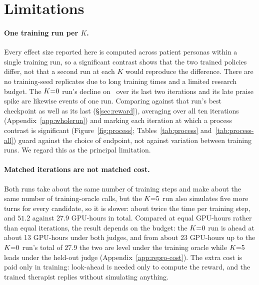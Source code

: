 \section*{Limitations}
\label{sec:limitations}

\paragraph{\boldmath One training run per $K$.}
Every effect size reported here is computed across patient personas within a single training run,
so a significant contrast shows that the two trained policies differ, not that a second run at each
$K$ would reproduce the difference. There are no training-seed replicates due to long training times and a limited research budget. The $K{=}0$
run's decline on \QQ\ over its last two iterations and its late praise spike are likewise events of
one run. Comparing against that run's best checkpoint as well as its last (\S\ref{sec:reward}),
averaging over all ten iterations (Appendix~\ref{app:wholerun}) and marking each iteration at which
a process contrast is significant (Figure~\ref{fig:process}; Tables~\ref{tab:process}
and~\ref{tab:process-all}) guard against the choice of endpoint, not against variation between
training runs. We regard this as the principal limitation.


\paragraph{Matched iterations are not matched cost.}
Both runs take about the same number of training steps and make about the same number of training-oracle calls, but the $K{=}5$ run also simulates five more turns for every candidate, so it is
slower: about twice the time per training step, and $51.2$ against $27.9$ GPU-hours in total.
Compared at equal GPU-hours rather than equal iterations, the result depends on the budget: the
$K{=}0$ run is ahead at about 13 GPU-hours under both judges, and from about 23 GPU-hours up to the
$K{=}0$ run's total of $27.9$ the two are level under the training oracle while $K{=}5$ leads under the
held-out judge (Appendix~\ref{app:repro-cost}). The extra cost is paid only in training: look-ahead
is needed only to compute the reward, and the trained therapist replies without simulating
anything.

